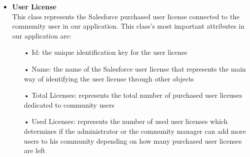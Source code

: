 \begin{itemize}
\begin{itemize}
\end{itemize}
\item \textbf{User License}\\
This class represents the Salesforce purchased user license connected to the community user in our application. This class's most important attributes in our application are:
\begin{itemize}
\item[•] Id: the unique identification key for the user license 
\item[•] Name: the name of the Salesforce user license that represents the main way of identifying the user license through other objects
\item[•] Total Licenses: represents the total number of purchased user licenses dedicated to community users 
\item[•] Used Licenses: represents the number of used user licenses which determines if the administrator or the community manager can add more users to his community depending on how many purchased user licenses are left


\end{itemize}
\end{itemize}
